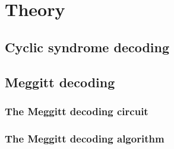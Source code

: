 \documentclass[MiniProjectMain]{subfiles}
\begin{document}
\chapter{Theory}

\section{Cyclic syndrome decoding}

\section{Meggitt decoding}

\subsection{The Meggitt decoding circuit}

\subsection{The Meggitt decoding algorithm}
\end{document}
